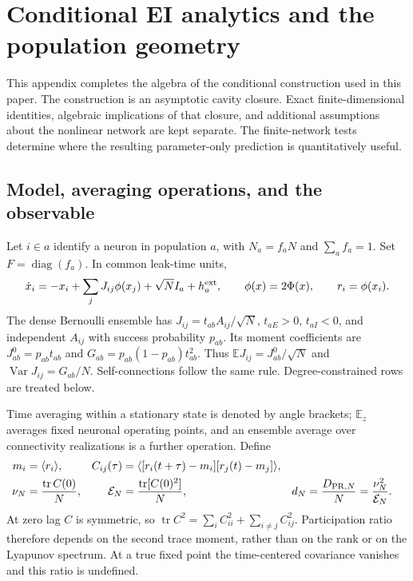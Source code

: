 \section{Conditional EI analytics and the population geometry}
\label{app:final_conditional_analytics}

This appendix completes the algebra of the conditional construction used in
this paper. The construction is an asymptotic cavity closure. Exact
finite-dimensional identities, algebraic implications of that closure, and
additional assumptions about the nonlinear network are kept separate. The
finite-network tests determine where the resulting parameter-only prediction
is quantitatively useful.

\subsection{Model, averaging operations, and the observable}

Let $i\in a$ identify a neuron in population $a$, with $N_a=f_aN$ and
$\sum_a f_a=1$. Set $F=\operatorname{diag}(f_a)$. In common leak-time units,
\begin{equation}
 \dot x_i=-x_i+\sum_jJ_{ij}\phi(x_j)+\sqrt N I_a+h_a^{\rm ext},
 \qquad \phi(x)=2\Phi(x),\qquad r_i=\phi(x_i).
 \label{eq:an_model}
\end{equation}
The dense Bernoulli ensemble has $J_{ij}=t_{ab}A_{ij}/\sqrt N$,
$t_{aE}>0$, $t_{aI}<0$, and independent $A_{ij}$ with success probability
$p_{ab}$. Its moment coefficients are
$J^0_{ab}=p_{ab}t_{ab}$ and $G_{ab}=p_{ab}(1-p_{ab})t_{ab}^2$.
Thus $\mathbb E J_{ij}=J^0_{ab}/\sqrt N$ and
$\operatorname{Var}J_{ij}=G_{ab}/N$. Self-connections follow the same rule.
Degree-constrained rows are treated below.

Time averaging within a stationary state is denoted by angle brackets;
$\mathbb E_z$ averages fixed neuronal operating points, and an ensemble average
over connectivity realizations is a further operation. Define
\begin{align}
 m_i&=\langle r_i\rangle,&
 C_{ij}(\tau)&=\langle[r_i(t+\tau)-m_i][r_j(t)-m_j]\rangle,\\
 \nu_N&=\frac{\operatorname{tr}C(0)}N,&
 \mathcal E_N&=\frac{\operatorname{tr}[C(0)^2]}N,&
 d_N&=\frac{D_{{\rm PR},N}}N=\frac{\nu_N^2}{\mathcal E_N}.
 \label{eq:an_observables}
\end{align}
At zero lag $C$ is symmetric, so
$\operatorname{tr}C^2=\sum_iC_{ii}^2+\sum_{i\ne j}C_{ij}^2$.
Participation ratio therefore depends on the second trace moment, rather
than on the rank or on the Lyapunov spectrum. At a true fixed point the
time-centered covariance vanishes and this ratio is undefined.

